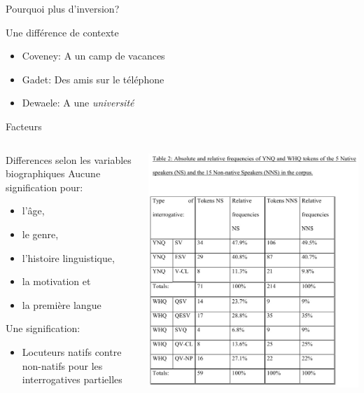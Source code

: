 \documentclass{beamer}
\begin{document}
    \begin{frame}{Pourquoi plus d'inversion?}
      \begin{block}{Une différence de contexte}
        \begin{itemize}
          \item Coveney: A un camp de vacances
          \item Gadet: Des amis sur le téléphone
          \item Dewaele: A une \emph{université}
        \end{itemize}
      \end{block}
    \end{frame}

    \begin{frame}[t]{Facteurs}
      \begin{columns}
          \begin{block}{Differences selon les variables biographiques}
            Aucune signification pour:
            \begin{itemize}
              \item l'âge,
              \item le genre,
              \item l'histoire linguistique,
              \item la motivation et
              \item la première langue
            \end{itemize}
            Une signification:
            \begin{itemize}
              \item Locuteurs natifs contre non-natifs pour les interrogatives partielles
            \end{itemize}
          \end{block}
          \includegraphics[scale=0.32]{resultats.jpg}

\end{columns}
\end{frame}
\end{document}
